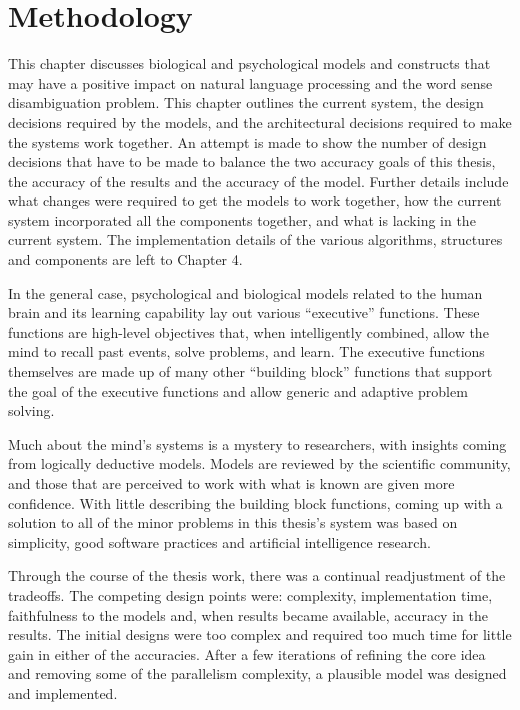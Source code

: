 \chapter{Methodology}

This chapter discusses biological and psychological models and constructs that
may have a positive impact on natural language processing and the word sense
disambiguation problem.  This chapter outlines the current system, the design
decisions required by the models, and the architectural decisions required to 
make the
systems work together.  An attempt is made to show the number of design
decisions that have to be made to balance the two accuracy goals of this thesis,
the accuracy of the results and the accuracy of the model. Further details
include what changes were required to get the models to work together, how the
current system incorporated all the components together, and what is lacking in
the current system.  The implementation details of the various algorithms,
structures and components are left to Chapter 4.

In the general case, psychological and biological models related to the human
brain and its learning capability lay out various ``executive'' functions.
These functions are high-level objectives that, when intelligently combined, allow
the mind to recall past events, solve problems, and learn. The executive
functions themselves are made up of many other ``building block'' functions that
support the goal of the executive functions and allow generic and adaptive
problem solving.

Much about the mind's systems is a mystery to researchers, with insights coming
from logically deductive models.  Models are reviewed by the scientific
community, and those that are perceived to work with what is known are given
more confidence.  With little describing the building block functions, coming up
with a solution to all of the minor problems in this thesis's system was based on
simplicity, good software practices and artificial intelligence research.

Through the course of the thesis work, there was a continual readjustment of the
tradeoffs. The competing design points were: complexity, implementation time,
faithfulness to the models and, when results became available, accuracy in the
results.  The initial designs were too complex and required too much time for
little gain in either of the accuracies.  After a few iterations of refining the
core idea and removing some of the parallelism complexity, a plausible model was
designed and implemented.

